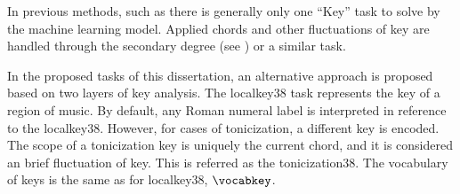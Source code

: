 
In previous methods, such as \textcite{chen2018functional,
chen2019harmony, micchi2020not, micchi2021deep,
mcleod2021modular} there is generally only one ``Key'' task
to solve by the machine learning model. Applied chords and
other fluctuations of key are handled through the secondary
degree (see ) or a similar
task.

In the proposed tasks of this dissertation, an alternative
approach is proposed based on two layers of key analysis.
The \gls{localkey38} task represents the key of a region of
music. By default, any Roman numeral label is interpreted in
reference to the \gls{localkey38}. However, for cases of
tonicization, a different key is encoded. The scope of a
tonicization key is uniquely the current chord, and it is
considered an brief fluctuation of key. This is referred as
the \gls{tonicization38}. The vocabulary of keys is the same
as for \gls{localkey38}, $\vocabkey$.
